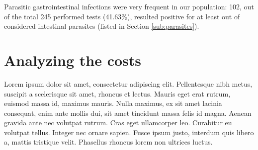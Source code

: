 
Parasitic gastrointestinal infections were very frequent in our population: 102, out of the total 245 performed tests (41.63\%), resulted positive for at least out of considered intestinal parasites (listed in Section \ref{sub:parasites}).



\section{Analyzing the costs}\label{sec:analyzingcosts}
Lorem ipsum dolor sit amet, consectetur adipiscing elit. Pellentesque nibh metus, suscipit a scelerisque sit amet, rhoncus et lectus. Mauris eget erat rutrum, euismod massa id, maximus mauris. Nulla maximus, ex sit amet lacinia consequat, enim ante mollis dui, sit amet tincidunt massa felis id magna. Aenean gravida ante nec volutpat rutrum. Cras eget ullamcorper leo. Curabitur eu volutpat tellus. Integer nec ornare sapien. Fusce ipsum justo, interdum quis libero a, mattis tristique velit. Phasellus rhoncus lorem non ultrices luctus.

